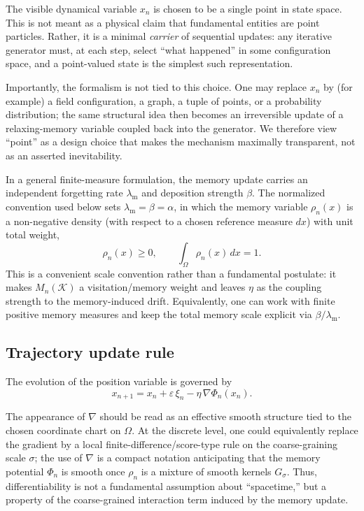 \documentclass[reprint,amsmath,amssymb,aps,prd,nofootinbib,floatfix]{revtex4-2}
\begin{document}
The visible dynamical variable $x_n$ is chosen to be a single point in state space.
This is not meant as a physical claim that fundamental entities are point particles.
Rather, it is a minimal \emph{carrier} of sequential updates: any iterative generator must, at each step, select ``what happened'' in some configuration space, and a point-valued state is the simplest such representation.

Importantly, the formalism is not tied to this choice.
One may replace $x_n$ by (for example) a field configuration, a graph, a tuple of points, or a probability distribution; the same structural idea then becomes an irreversible update of a relaxing-memory variable coupled back into the generator.
We therefore view ``point'' as a design choice that makes the mechanism maximally transparent, not as an asserted inevitability.

In a general finite-measure formulation, the memory update carries an
independent forgetting rate $\lambda_{\mathrm m}$ and deposition strength
$\beta$. The normalized convention used below sets
$\lambda_{\mathrm m}=\beta=\alpha$, in
which the memory variable $\rho_n(x)$ is a non-negative density (with respect
to a chosen reference measure $dx$) with unit total weight,
\begin{equation}
\rho_n(x) \ge 0,
\qquad
\int_\Omega \rho_n(x)\,dx = 1.
\end{equation}
This is a convenient scale convention rather than a fundamental postulate: it
makes $M_n(\mathcal{K})$ a visitation/memory weight and leaves $\eta$ as the
coupling strength to the memory-induced drift. Equivalently, one can work with
finite positive memory measures and keep the total memory scale explicit via
$\beta/\lambda_{\mathrm m}$.

\subsection{Trajectory update rule}

The evolution of the position variable is governed by
\begin{equation}\label{eq:trajectory}
x_{n+1} = x_n + \varepsilon\,\xi_n - \eta\,\nabla\Phi_n(x_n).
\end{equation}

The appearance of $\nabla$ should be read as an effective smooth structure tied to the chosen coordinate chart on $\Omega$.
At the discrete level, one could equivalently replace the gradient by a local finite-difference/score-type rule on the coarse-graining scale $\sigma$; the use of $\nabla$ is a compact notation anticipating that the memory potential $\Phi_n$ is smooth once $\rho_n$ is a mixture of smooth kernels $G_\sigma$.
Thus, differentiability is not a fundamental assumption about ``spacetime,'' but a property of the coarse-grained interaction term induced by the memory update.
\end{document}
